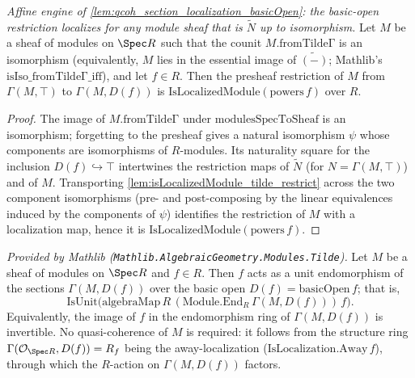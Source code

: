 \begin{lemma}
  \label{lem:isLocalizedModule_restrict_of_isIso_fromTildeΓ}
  \textit{Affine engine of \cref{lem:qcoh_section_localization_basicOpen}: the basic-open
  restriction localizes for any module sheaf that is \(\widetilde{N}\) up to isomorphism.}
  Let \(M\) be a sheaf of modules on \(\Spec R\) such that the counit
  \(M.\mathrm{fromTildeΓ}\) is an isomorphism (equivalently, \(M\) lies in the essential image of
  \(\widetilde{(-)}\); Mathlib's \(\mathrm{isIso\_fromTildeΓ\_iff}\)), and let \(f \in R\). Then the
  presheaf restriction of \(M\) from \(\Gamma(M, \top)\) to \(\Gamma(M, D(f))\) is
  \(\mathrm{IsLocalizedModule}(\mathrm{powers}\,f)\) over \(R\).
\end{lemma}
\begin{proof}
  The image of \(M.\mathrm{fromTildeΓ}\) under \(\mathrm{modulesSpecToSheaf}\) is an isomorphism;
  forgetting to the presheaf gives a natural isomorphism \(\psi\) whose components are isomorphisms
  of \(R\)-modules. Its naturality square for the inclusion \(D(f) \hookrightarrow \top\)
  intertwines the restriction maps of \(\widetilde{N}\) (for \(N = \Gamma(M, \top)\)) and of \(M\).
  Transporting \cref{lem:isLocalizedModule_tilde_restrict} across the two component isomorphisms
  (pre- and post-composing by the linear equivalences induced by the components of \(\psi\))
  identifies the restriction of \(M\) with a localization map, hence it is
  \(\mathrm{IsLocalizedModule}(\mathrm{powers}\,f)\).
\end{proof}

\begin{lemma}
  \label{lem:isUnit_algebraMap_end_basicOpen_mathlib}
  \mathlibok
  \textit{Provided by Mathlib (\texttt{Mathlib.AlgebraicGeometry.Modules.Tilde}).}
  Let \(M\) be a sheaf of modules on \(\Spec R\) and \(f \in R\). Then \(f\) acts as a unit
  endomorphism of the sections \(\Gamma(M, D(f))\) over the basic open
  \(D(f) = \mathrm{basicOpen}\,f\); that is,
  \[
    \mathrm{IsUnit}\bigl(\mathrm{algebraMap}\,R\,(\mathrm{Module.End}_R\,\Gamma(M, D(f)))\,f\bigr).
  \]
  Equivalently, the image of \(f\) in the endomorphism ring of \(\Gamma(M, D(f))\) is invertible.
  No quasi-coherence of \(M\) is required: it follows from the structure ring
  \(\Gamma(\mathcal{O}_{\Spec R}, D(f)) = R_f\) being the away-localization
  (\(\mathrm{IsLocalization.Away}\,f\)), through which the \(R\)-action on \(\Gamma(M, D(f))\)
  factors.
\end{lemma}

